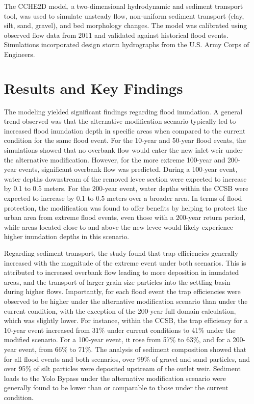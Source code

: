 \documentclass[a4paper, 11pt]{article}
\begin{document}
The CCHE2D model, a two-dimensional hydrodynamic and sediment transport tool, was used to simulate unsteady flow, non-uniform sediment transport (clay, silt, sand, gravel), and bed morphology changes. The model was calibrated using observed flow data from 2011 and validated against historical flood events. Simulations incorporated design storm hydrographs from the U.S. Army Corps of Engineers.

\section{Results and Key Findings}

\hspace*{0.5cm}The modeling yielded significant findings regarding flood inundation. A general trend observed was that the alternative modification scenario typically led to increased flood inundation depth in specific areas when compared to the current condition for the same flood event. For the 10-year and 50-year flood events, the simulations showed that no overbank flow would enter the new inlet weir under the alternative modification. However, for the more extreme 100-year and 200-year events, significant overbank flow was predicted. During a 100-year event, water depths downstream of the removed levee section were expected to increase by 0.1 to 0.5 meters. For the 200-year event, water depths within the CCSB were expected to increase by 0.1 to 0.5 meters over a broader area. In terms of flood protection, the modification was found to offer benefits by helping to protect the urban area from extreme flood events, even those with a 200-year return period, while areas located close to and above the new levee would likely experience higher inundation depths in this scenario.

\hspace*{0.5cm}Regarding sediment transport, the study found that trap efficiencies generally increased with the magnitude of the extreme event under both scenarios. This is attributed to increased overbank flow leading to more deposition in inundated areas, and the transport of larger grain size particles into the settling basin during higher flows. Importantly, for each flood event the trap efficiencies were observed to be higher under the alternative modification scenario than under the current condition, with the exception of the 200-year full domain calculation, which was slightly lower. For instance, within the CCSB, the trap efficiency for a 10-year event increased from 31\% under current conditions to 41\% under the modified scenario. For a 100-year event, it rose from 57\% to 63\%, and for a 200-year event, from 66\% to 71\%. The analysis of sediment composition showed that for all flood events and both scenarios, over 99\% of gravel and sand particles, and over 95\% of silt particles were deposited upstream of the outlet weir. Sediment loads to the Yolo Bypass under the alternative modification scenario were generally found to be lower than or comparable to those under the current condition.
\end{document}
